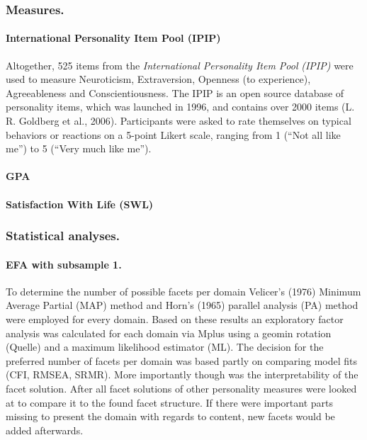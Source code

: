 \documentclass[man]{apa6}
\theoremstyle{definition}
\theoremstyle{definition}
\theoremstyle{definition}
\theoremstyle{remark}
\begin{document}
\hypertarget{measures.}{%
\subsubsection{Measures.}\label{measures.}}

\hypertarget{international-personality-item-pool-ipip}{%
\paragraph{International Personality Item Pool
(IPIP)}\label{international-personality-item-pool-ipip}}

Altogether, 525 items from the \emph{International Personality Item
Pool} \emph{(IPIP)} were used to measure Neuroticism, Extraversion,
Openness (to experience), Agreeableness and Conscientiousness. The IPIP
is an open source database of personality items, which was launched in
1996, and contains over 2000 items (L. R. Goldberg et al., 2006).
Participants were asked to rate themselves on typical behaviors or
reactions on a 5-point Likert scale, ranging from 1 (\enquote{Not all
like me}) to 5 (\enquote{Very much like me}).

\hypertarget{gpa}{%
\paragraph{GPA}\label{gpa}}

\hypertarget{satisfaction-with-life-swl}{%
\paragraph{Satisfaction With Life
(SWL)}\label{satisfaction-with-life-swl}}

\hypertarget{statistical-analyses.}{%
\subsubsection{Statistical analyses.}\label{statistical-analyses.}}

\hypertarget{efa-with-subsample-1.}{%
\paragraph{EFA with subsample 1.}\label{efa-with-subsample-1.}}

To determine the number of possible facets per domain Velicer's (1976)
Minimum Average Partial (MAP) method and Horn's (1965) parallel analysis
(PA) method were employed for every domain. Based on these results an
exploratory factor analysis was calculated for each domain via Mplus
using a geomin rotation (Quelle) and a maximum likelihood estimator
(ML). The decision for the preferred number of facets per domain was
based partly on comparing model fits (CFI, RMSEA, SRMR). More
importantly though was the interpretability of the facet solution. After
all facet solutions of other personality measures were looked at to
compare it to the found facet structure. If there were important parts
missing to present the domain with regards to content, new facets would
be added afterwards.
\end{document}
